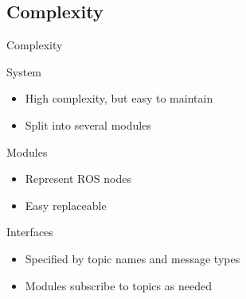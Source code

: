 \subsection{Complexity}
\begin{frame}{Complexity}
    \begin{block}{System}
        \begin{itemize}
            \item High complexity, but easy to maintain
            \item Split into several modules
        \end{itemize}
    \end{block}
    \begin{block}{Modules}
        \begin{itemize}
            \item Represent ROS nodes
            \item Easy replaceable
        \end{itemize}
    \end{block}
    \begin{block}{Interfaces}
        \begin{itemize}
            \item Specified by topic names and message types
            \item Modules subscribe to topics as needed
        \end{itemize}
    \end{block}
\end{frame}